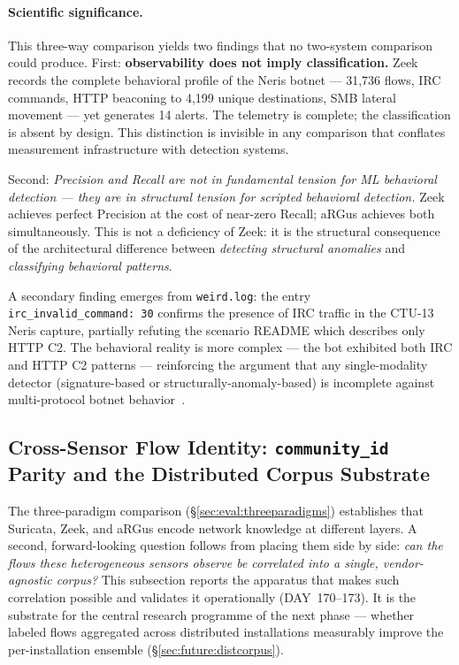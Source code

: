 \documentclass[11pt,a4paper]{article}
\begin{document}
    \paragraph{Scientific significance.}
    This three-way comparison yields two findings that no two-system comparison could
    produce. First: \textbf{observability does not imply classification.} Zeek records
    the complete behavioral profile of the Neris botnet --- 31,736 flows, IRC commands,
    HTTP beaconing to 4,199 unique destinations, SMB lateral movement --- yet generates
    14 alerts. The telemetry is complete; the classification is absent by design.
    This distinction is invisible in any comparison that conflates measurement
    infrastructure with detection systems.

    Second: \emph{Precision and Recall are not in fundamental tension for ML behavioral
    detection --- they are in structural tension for scripted behavioral detection.}
    Zeek achieves perfect Precision at the cost of near-zero Recall; aRGus achieves
    both simultaneously. This is not a deficiency of Zeek: it is the structural
    consequence of the architectural difference between \emph{detecting structural
    anomalies} and \emph{classifying behavioral patterns}.

    A secondary finding emerges from \texttt{weird.log}: the entry
    \texttt{irc\_invalid\_command:~30} confirms the presence of IRC traffic in the
    CTU-13 Neris capture, partially refuting the scenario README which describes only
    HTTP C2. The behavioral reality is more complex --- the bot exhibited both IRC and
    HTTP C2 patterns --- reinforcing the argument that any single-modality detector
    (signature-based or structurally-anomaly-based) is incomplete against multi-protocol
    botnet behavior~\cite{asad2023perspective}.


    \subsection{Cross-Sensor Flow Identity: \texttt{community\_id} Parity and the
    Distributed Corpus Substrate}
    \label{sec:eval:parity}

    The three-paradigm comparison (\S\ref{sec:eval:threeparadigms}) establishes that
    Suricata, Zeek, and aRGus encode network knowledge at different layers. A second,
    forward-looking question follows from placing them side by side: \emph{can the flows
    these heterogeneous sensors observe be correlated into a single, vendor-agnostic
    corpus?} This subsection reports the apparatus that makes such correlation possible
    and validates it operationally (DAY~170--173). It is the substrate for the central
    research programme of the next phase --- whether labeled flows aggregated across
    distributed installations measurably improve the per-installation ensemble
    (\S\ref{sec:future:distcorpus}).
\end{document}
